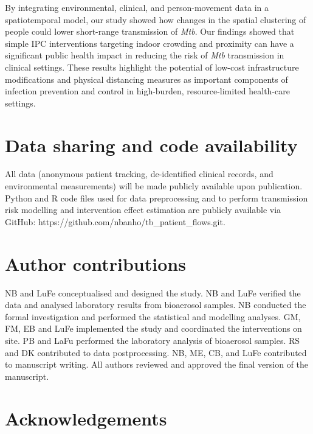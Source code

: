 \documentclass[11pt]{article}
\begin{document}
By integrating environmental, clinical, and person-movement data in a spatiotemporal model, our study showed how changes in the spatial clustering of people could lower short-range transmission of \emph{Mtb}. Our findings showed that simple IPC interventions targeting indoor crowding and proximity can have a significant public health impact in reducing the risk of \emph{Mtb} transmission in clinical settings. These results highlight the potential of low-cost infrastructure modifications and physical distancing measures as important components of infection prevention and control in high-burden, resource-limited health-care settings.




\clearpage
\titleformat{\section}{\bfseries\fontsize{14}{16}\selectfont}{}{0em}{}
\section{Data sharing and code availability}\label{data-sharing-and-code-availability}

All data (anonymous patient tracking, de-identified clinical records, and environmental measurements) will be made publicly available upon publication. Python and R code files used for data preprocessing and to perform transmission risk modelling and intervention effect estimation are publicly available via GitHub: https://github.com/nbanho/tb\_patient\_flows.git.

\section{Author contributions}\label{author-contributions}

NB and LuFe conceptualised and designed the study. NB and LuFe verified the data and analysed laboratory results from bioaerosol samples. NB conducted the formal investigation and performed the statistical and modelling analyses. GM, FM, EB and LuFe implemented the study and coordinated the interventions on site. PB and LaFu performed the laboratory analysis of bioaerosol samples. RS and DK contributed to data postprocessing. NB, ME, CB, and LuFe contributed to manuscript writing. All authors reviewed and approved the final version of the manuscript.

\section{Acknowledgements}\label{acknowledgements}
\end{document}
